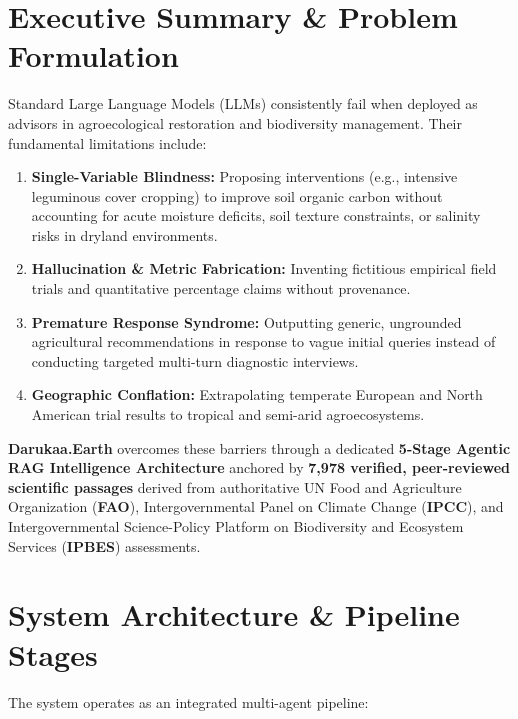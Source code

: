 \documentclass[11pt,a4paper]{article}
\begin{document}
\section{Executive Summary \& Problem Formulation}
Standard Large Language Models (LLMs) consistently fail when deployed as advisors in agroecological restoration and biodiversity management. Their fundamental limitations include:
\begin{enumerate}[itemsep=1pt]
    \item \textbf{Single-Variable Blindness:} Proposing interventions (e.g., intensive leguminous cover cropping) to improve soil organic carbon without accounting for acute moisture deficits, soil texture constraints, or salinity risks in dryland environments.
    \item \textbf{Hallucination \& Metric Fabrication:} Inventing fictitious empirical field trials and quantitative percentage claims without provenance.
    \item \textbf{Premature Response Syndrome:} Outputting generic, ungrounded agricultural recommendations in response to vague initial queries instead of conducting targeted multi-turn diagnostic interviews.
    \item \textbf{Geographic Conflation:} Extrapolating temperate European and North American trial results to tropical and semi-arid agroecosystems.
\end{enumerate}

\textbf{Darukaa.Earth} overcomes these barriers through a dedicated \textbf{5-Stage Agentic RAG Intelligence Architecture} anchored by \textbf{7,978 verified, peer-reviewed scientific passages} derived from authoritative UN Food and Agriculture Organization (\textbf{FAO}), Intergovernmental Panel on Climate Change (\textbf{IPCC}), and Intergovernmental Science-Policy Platform on Biodiversity and Ecosystem Services (\textbf{IPBES}) assessments.

\section{System Architecture \& Pipeline Stages}

The system operates as an integrated multi-agent pipeline:
\end{document}
